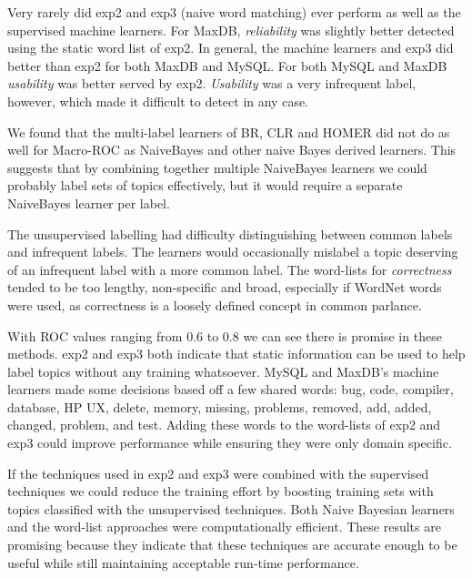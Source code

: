 \documentclass[]{sig-alternate}
\begin{document}
Very rarely did \textsf{exp2} and \textsf{exp3} (naive word matching) ever perform as well as the supervised machine learners. 
For MaxDB, \textit{reliability} was slightly better detected using the static word list of \textsf{exp2}. 
In general, the machine learners and \textsf{exp3} did better than \textsf{exp2} for both MaxDB and MySQL. 
For both MySQL and MaxDB \textit{usability} was better served by \textsf{exp2}. 
\textit{Usability} was a very infrequent label, however, which made it difficult to detect in any case.

We found that the multi-label learners of BR, CLR and HOMER did not do as well for Macro-ROC as NaiveBayes and other naive Bayes derived learners. 
This suggests that by combining together multiple NaiveBayes learners we could probably label sets of topics effectively, but it would require a separate NaiveBayes learner per label.


The unsupervised labelling had difficulty distinguishing between common labels and infrequent labels. 
The learners would occasionally mislabel a topic deserving of an infrequent label with a more common label.
The word-lists for \emph{correctness} tended to be too lengthy, non-specific and broad, especially if WordNet words were used, as correctness is a loosely defined concept in common parlance.

With ROC values ranging from $0.6$ to $0.8$ we can see there is promise in these methods.
\textsf{exp2} and \textsf{exp3} both indicate that static information can be used to help label topics without any training whatsoever. 
MySQL and MaxDB's machine learners made some decisions based off a few shared words: \textsf{bug, code, compiler, database, HP UX, delete, memory, missing, problems, removed, add, added, changed, problem, and test}. 
Adding these words to the word-lists of \textsf{exp2} and \textsf{exp3} could improve performance while ensuring they were only domain specific.

If the techniques used in \textsf{exp2} and \textsf{exp3} were combined with the supervised techniques we could reduce the training effort by boosting training sets with topics classified with the unsupervised techniques.
Both Naive Bayesian learners and the word-list approaches were computationally efficient.  
These results are promising because they indicate that these techniques are accurate enough to be useful while still maintaining acceptable run-time performance.
\end{document}
